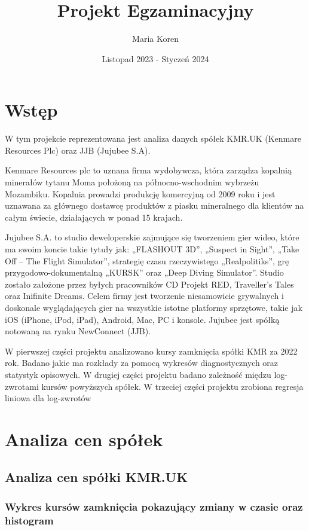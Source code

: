 \documentclass[a4paper,11pt]{article}
\title{Projekt Egzaminacyjny}
\author{Maria Koren}
\date{Listopad 2023 - Styczeń 2024}
\begin{document}
\maketitle
\newpage
\tableofcontents{}
\newpage

\section{Wstęp}
W tym projekcie reprezentowana jest analiza danych spółek KMR.UK (Kenmare Resources Plc) oraz JJB (Jujubee S.A). 

Kenmare Resources plc to uznana firma wydobywcza, która zarządza kopalnią minerałów tytanu Moma położoną na północno-wschodnim wybrzeżu Mozambiku.
Kopalnia prowadzi produkcję komercyjną od 2009 roku i jest uznawana za głównego dostawcę produktów z piasku mineralnego dla klientów na całym świecie, działających w ponad
15 krajach.

Jujubee S.A. to studio deweloperskie zajmujące
się tworzeniem gier wideo, które ma swoim koncie
takie tytuły jak: „FLASHOUT 3D”, „Suspect in
Sight”, „Take Off – The Flight Simulator”,
strategię czasu rzeczywistego „Realpolitiks”, grę
przygodowo-dokumentalną „KURSK” oraz „Deep Diving
Simulator”. Studio zostało założone przez byłych
pracowników CD Projekt RED, Traveller’s Tales oraz
Inifinite Dreams. Celem firmy jest tworzenie niesamowicie
grywalnych i doskonale wyglądających gier na wszystkie
istotne platformy sprzętowe, takie jak iOS (iPhone,
iPod, iPad), Android, Mac, PC i konsole. Jujubee jest
spółką notowaną na rynku NewConnect (JJB).

W pierwszej części projektu analizowano kursy zamknięcia spółki KMR za 2022 rok. Badano jakie ma rozkłady za pomocą wykresów diagnostycznych oraz statystyk opisowych. W drugiej części projektu badano zależność międzu log-zwrotami kursów powyższych spółek. W trzeciej części projektu zrobiona regresja liniowa dla log-zwrotów

\newpage
\section{Analiza cen spółek}
\subsection{Analiza cen spółki KMR.UK}
\subsubsection{Wykres kursów zamknięcia pokazujący zmiany w czasie oraz
histogram}
\end{document}
